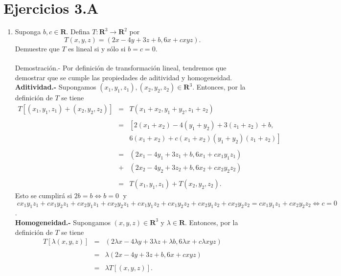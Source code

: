 \section*{Ejercicios 3.A}

\begin{enumerate}[\bfseries 1.]

    \item Suponga $b,c\in \textbf{R}$. Defina $T:\textbf{R}^3\to \textbf{R}^2$ por
    $$T(x,y,z)=(2x-4y+3z+b,6x+cxyz).$$
    Demuestre que $T$ es lineal si y sólo si $b=c=0$.\\\\
	Demostración.-\; Por definición de transformación lineal, tendremos que demostrar que se cumple las propiedades de aditividad y homogeneidad.\\

	\textbf{Aditividad.- } Supongamos $(x_1,y_1,z_1),(x_2,y_2,z_2)\in \textbf{R}^3$. Entonces, por la definición de $T$ se tiene
	$$
	\begin{array}{rcl}
	    T\left[(x_1,y_1,z_1)+(x_2,y_2,z_2)\right] &=& T(x_1+x_2,y_1+y_2,z_1+z_2)\\\\
						      &=& \left[2(x_1+x_2)-4(y_1+y_2)+3(z_1+z_2)+b,\right.\\
						      && \left.6(x_1+x_2)+c(x_1+x_2)(y_1+y_2)(z_1+z_2)\right]\\\\
						      &=& (2x_1-4y_1+3z_1+b,6x_1+cx_1y_1z_1)\\
						      &+&(2x_2-4y_2+3z_2+b,6x_2+cx_2y_2z_2)\\\\
						      &=& T(x_1,y_1,z_1)+T(x_2,y_2,z_2).
	\end{array}
	$$
	Esto se cumplirá si $2b=b\Leftrightarrow b=0\;$ y $\;cx_1y_1z_1+cx_1y_2z_1+cx_2y_1z_1+cx_2y_2z_1+cx_1y_1z_2+cx_1y_2z_2+cx_2y_1z_2+cx_2y_2z_2 = cx_1y_1z_1+cx_2y_2z_2 \Leftrightarrow c=0$.\\

	\textbf{Homogeneidad.- } Supongamos $(x,y,z)\in \textbf{R}^3$ y $\lambda \in \textbf{R}$. Entonces, por la definición de $T$ se tiene
	$$
	\begin{array}{rcl}
	    T\left[\lambda(x,y,z)\right] &=& (2\lambda x - 4\lambda y+3\lambda z + \lambda b, 6\lambda x + c\lambda xyz)\\\\
					 &=& \lambda(2x-4y+3z+b,6x+cxyz)\\\\
					 &=& \lambda T\left[(x,y,z)\right].
	\end{array}
	$$


\end{enumerate}
